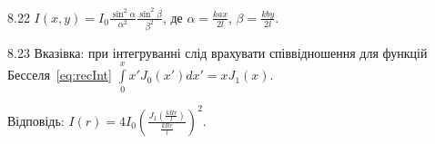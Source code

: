 \begin{Solution}{8.{22}}
	$I(x,y) = I_0\frac{\sin^2\alpha}{\alpha^2}\frac{\sin^2\beta}{\beta^2}$, де $\alpha = \frac{kax}{2l}$, $\beta=\frac{kby}{2l}$.
\end{Solution}
\begin{Solution}{8.{23}}
    Вказівка: при інтегруванні слід врахувати співвідношення для функцій Бесселя~\eqref{eq:recInt} $\int\limits_0^x x'J_0(x')dx' = xJ_1(x)$.

	Відповідь: $I(r) = 4I_0\left( \frac{J_1\left( \frac{kRr}{l}\right) }{\frac{kRr}{l}}\right)^2$.
\end{Solution}
